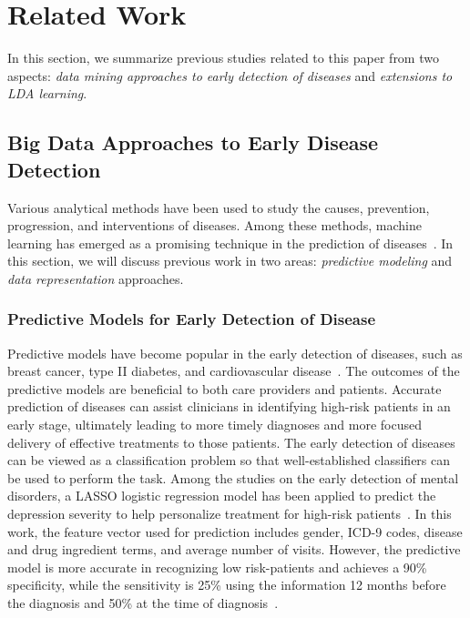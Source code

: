 \section{Related Work}\label{sec:2}

In this section, we summarize previous studies related to this paper from two aspects: \emph{data mining approaches to early detection of diseases} and \emph{extensions to LDA learning}.

\subsection{Big Data Approaches to Early Disease Detection}

Various analytical methods have been used to study the causes, prevention, progression, and interventions of diseases.  
Among these methods, machine learning has emerged as a promising technique in the prediction of diseases~\cite{maroco_data_2011, huang_toward_2014}.
In this section, we will discuss previous work in two areas: \emph{predictive modeling} and \emph{data representation} approaches.


\subsubsection{Predictive Models for Early Detection of Disease} 
Predictive models have become popular in the early detection of diseases, such as breast cancer, type II diabetes, and cardiovascular disease~\cite{Lindstrom01032003, riskprediction, zheng_predictive_2015, yoo_data_2011}.
The outcomes of the predictive models are beneficial to both care providers and patients.
Accurate prediction of diseases can assist clinicians in identifying high-risk patients in an early stage, ultimately leading to more timely diagnoses and more focused delivery of effective treatments to those patients.
The early detection of diseases can be viewed as a classification problem so that well-established classifiers can be used to perform the task.
Among the studies on the early detection of mental disorders, a LASSO logistic regression model has been applied to predict the depression severity to help personalize treatment for high-risk patients~\cite{huang_toward_2014}.
In this work, the feature vector used for prediction includes gender, ICD-9 codes, disease and drug ingredient terms, and average number of visits.
However, the predictive model is more accurate in recognizing low risk-patients and achieves a 90\% specificity, while the sensitivity is 25\% using the information 12 months before the diagnosis and 50\% at the time of diagnosis~\cite{huang_toward_2014}.
  

